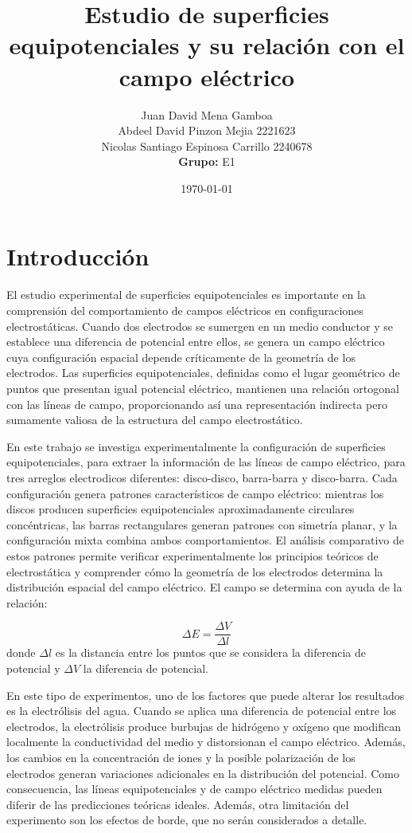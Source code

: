 \documentclass[11pt,twocolumn]{article}
\title{\textbf{Estudio de superficies equipotenciales y su relación con el campo eléctrico}}
\author{%
  Juan David Mena Gamboa\\
  Abdeel David Pinzon Mejia 2221623                   \\
  Nicolas Santiago Espinosa Carrillo 2240678                  \\
  \textbf{Grupo:} E1
}
\date{\today}
\begin{document}
\maketitle
\thispagestyle{fancy}

\section{Introducción}
El estudio experimental de superficies equipotenciales es importante en la comprensión del comportamiento de campos eléctricos en configuraciones electrostáticas. Cuando dos electrodos se sumergen en un medio conductor y se establece una diferencia de potencial entre ellos, se genera un campo eléctrico cuya configuración espacial depende críticamente de la geometría de los electrodos. Las superficies equipotenciales, definidas como el lugar geométrico de puntos que presentan igual potencial eléctrico, mantienen una relación ortogonal con las líneas de campo, proporcionando así una representación indirecta pero sumamente valiosa de la estructura del campo electrostático.

En este trabajo se investiga experimentalmente la configuración de superficies equipotenciales, para extraer la información de las líneas de campo eléctrico, para tres arreglos electrodicos diferentes: disco-disco, barra-barra y disco-barra. Cada configuración genera patrones característicos de campo eléctrico: mientras los discos producen superficies equipotenciales aproximadamente circulares concéntricas, las barras rectangulares generan patrones con simetría planar, y la configuración mixta combina ambos comportamientos. El análisis comparativo de estos patrones permite verificar experimentalmente los principios teóricos de electrostática y comprender cómo la geometría de los electrodos determina la distribución espacial del campo eléctrico. El campo se determina con ayuda de la relación:

\[\Delta E = \frac{\Delta V}{\Delta l}\] donde \(\Delta l\) es la distancia entre los puntos que se considera la diferencia de potencial y \(\Delta V\) la diferencia de potencial.

En este tipo de experimentos, uno de los factores que puede alterar los resultados es la electrólisis del agua. Cuando se aplica una diferencia de potencial entre los electrodos, la electrólisis produce burbujas de hidrógeno y oxígeno que modifican localmente la conductividad del medio y distorsionan el campo eléctrico. Además, los cambios en la concentración de iones y la posible polarización de los electrodos generan variaciones adicionales en la distribución del potencial. Como consecuencia, las líneas equipotenciales y de campo eléctrico medidas pueden diferir de las predicciones teóricas ideales. Además, otra limitación del experimento son los efectos de borde, que no serán considerados a detalle.
\end{document}
